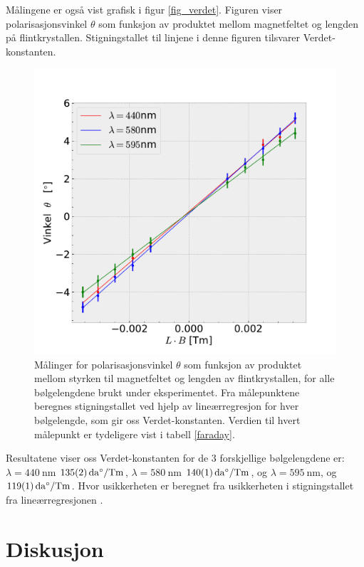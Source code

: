 \documentclass[%
 reprint,
 amsmath,amssymb,
 aps,
 norsk,
]{revtex4-1}
\begin{document}
Målingene er også vist grafisk i figur \vref{fig_verdet}. Figuren viser polarisasjonsvinkel $\theta$ som funksjon av produktet mellom magnetfeltet og lengden på flintkrystallen. Stigningstallet til linjene i denne figuren tilsvarer Verdet-konstanten.
\begin{figure}[ht!]
  \centering
  \includegraphics[scale=0.45]{faraday_effekt.pdf}
  \caption{Målinger for polarisasjonsvinkel $\theta$ som funksjon av produktet mellom styrken til magnetfeltet og lengden av flintkrystallen, for alle bølgelengdene brukt under eksperimentet. Fra målepunktene beregnes stigningstallet ved hjelp av lineærregresjon for hver bølgelengde, som gir oss Verdet-konstanten. Verdien til hvert målepunkt er tydeligere vist i tabell \vref{faraday}.}
  \label{fig_verdet}
\end{figure}
Resultatene viser oss Verdet-konstanten for de $3$ forskjellige bølgelengdene er: $\lambda = \SI{440}{\nano\meter}$ $\SI{135\pm2}{\deca\degree/\tesla\meter}$, $\lambda = \SI{580}{\nano\meter}$ $\SI{140\pm1}{\deca\degree/\tesla\meter}$, og $\lambda = \SI{595}{\nano\meter}$,
 og $\SI{119\pm1}{\deca\degree/\tesla\meter}$. Hvor usikkerheten er beregnet fra usikkerheten i stigningstallet fra lineærregresjonen \cite{squires}.
\section{Diskusjon}
\end{document}
